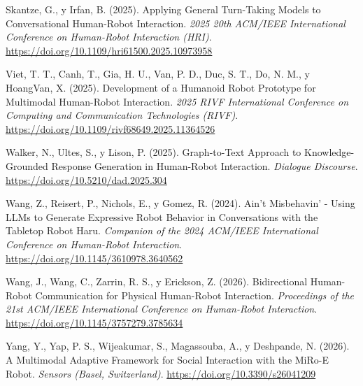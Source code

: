  Skantze, G., y Irfan, B. (2025). Applying General Turn-Taking Models to Conversational Human-Robot Interaction. \textit{2025 20th ACM/\allowbreak{}IEEE International Conference on Human-Robot Interaction (HRI)}. \url{https://doi.org/10.1109/hri61500.2025.10973958}

 Viet, T. T., Canh, T., Gia, H. U., Van, P. D., Duc, S. T., Do, N. M., y HoangVan, X. (2025). Development of a Humanoid Robot Prototype for Multimodal Human-Robot Interaction. \textit{2025 RIVF International Conference on Computing and Communication Technologies (RIVF)}. \url{https://doi.org/10.1109/rivf68649.2025.11364526}

 Walker, N., Ultes, S., y Lison, P. (2025). Graph-to-Text Approach to Knowledge-Grounded Response Generation in Human-Robot Interaction. \textit{Dialogue Discourse}. \url{https://doi.org/10.5210/dad.2025.304}

 Wang, Z., Reisert, P., Nichols, E., y Gomez, R. (2024). Ain't Misbehavin' - Using LLMs to Generate Expressive Robot Behavior in Conversations with the Tabletop Robot Haru. \textit{Companion of the 2024 ACM/\allowbreak{}IEEE International Conference on Human-Robot Interaction}. \url{https://doi.org/10.1145/3610978.3640562}

 Wang, J., Wang, C., Zarrin, R. S., y Erickson, Z. (2026). Bidirectional Human-Robot Communication for Physical Human-Robot Interaction. \textit{Proceedings of the 21st ACM/\allowbreak{}IEEE International Conference on Human-Robot Interaction}. \url{https://doi.org/10.1145/3757279.3785634}

 Yang, Y., Yap, P. S., Wijeakumar, S., Magassouba, A., y Deshpande, N. (2026). A Multimodal Adaptive Framework for Social Interaction with the MiRo-E Robot. \textit{Sensors (Basel, Switzerland)}. \url{https://doi.org/10.3390/s26041209}
